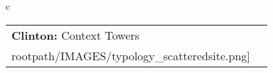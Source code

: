 \begin{table}[H]
        \begin{tabular}{c}
        \begin{tabular}{m{1.5in} m{2in}}
\textbf{Clinton:} {Context Towers} & \texttt{[image: \\rootpath/IMAGES/typology\_scatteredsite.png]}
\end{tabular}\end{tabular}
        \end{table}